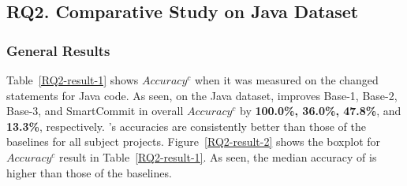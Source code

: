 \subsection{{\bf RQ2. Comparative Study on Java Dataset}}






\subsubsection{General Results}

Table~\ref{RQ2-result-1} shows $Accuracy^{c}$ when it was measured on
the changed statements for Java code.  As seen, on the Java dataset,
{\tool} improves Base-1, Base-2, Base-3, and SmartCommit in overall
$Accuracy^c$ by {\bf 100.0\%, 36.0\%, 47.8\%}, and {\bf 13.3\%},
respectively. {\tool}'s accuracies are consistently better than those
of the baselines for all subject projects. Figure~\ref{RQ2-result-2}
shows the boxplot for $Accuracy^c$ result in
Table~\ref{RQ2-result-1}. As seen, the median accuracy of {\tool} is
higher than those of the baselines.



